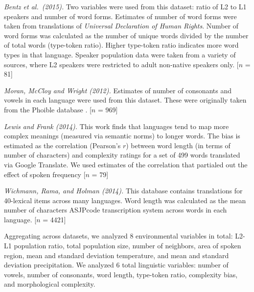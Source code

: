 \documentclass[10pt,letterpaper]{article}
\begin{document}
{\it Bentz et al.\ (2015).} Two variables were used from this dataset: ratio of L2 to L1 speakers and number of word forms. Estimates of number of word forms were taken from translations of  {\it Universal Declaration of Human Rights}. Number of word forms was calculated as the number of unique words divided by the number of total words (type-token ratio). Higher type-token ratio indicates more word types in that language. Speaker population data were taken from a variety of sources, where L2 speakers were restricted to adult non-native speakers only. [$n$ = 81]

{\it Moran, McCloy and Wright (2012).} Estimates of number of consonants and vowels in each language were used from this dataset. These were originally taken from the Phoible database \cite{phoible}. [$n$ = 969]


{\it Lewis and Frank (2014).} This work finds that languages tend to map more complex meanings (measured via semantic norms) to longer words. The bias is estimated as the correlation (Pearson's $r$) between word length (in terms of number of characters) and complexity ratings for a set of 499 words translated via Google Translate. We used estimates of the correlation that partialed out the effect of spoken frequency [$n$ = 79]

{\it Wichmann, Rama, and Holman (2014).} This database contains translations for 40-lexical items across many languages. Word length was calculated as the mean number of characters ASJPcode transcription system across words in each language. [$n$ = 4421]

Aggregating across datasets, we analyzed 8 environmental variables in total: L2-L1 population ratio, total population size, number of neighbors, area of spoken region, mean and standard deviation temperature, and mean and standard deviation precipitation. We analyzed 6 total linguistic variables: number of vowels, number of consonants, word length, type-token ratio, complexity bias, and morphological complexity.
\end{document}
